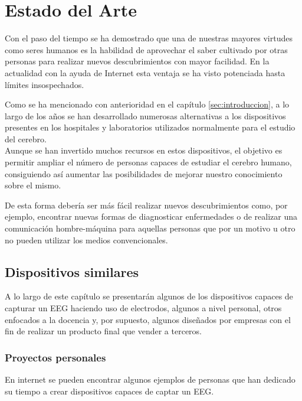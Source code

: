 \chapter{Estado del Arte\label{sec:EstadoDelArte}}

Con el paso del tiempo se ha demostrado que una de nuestras mayores virtudes como seres humanos es la habilidad de aprovechar el saber cultivado por otras personas para realizar nuevos descubrimientos con mayor facilidad. En la actualidad con la ayuda de Internet esta ventaja se ha visto potenciada hasta límites insospechados.

Como se ha mencionado con anterioridad en el capítulo \ref{sec:introduccion}, a lo largo de los años se han desarrollado numerosas alternativas a los dispositivos presentes en los hospitales y laboratorios utilizados normalmente para el estudio del cerebro. 
\\Aunque se han invertido muchos recursos en estos dispositivos, el objetivo es permitir ampliar el número de personas capaces de estudiar el cerebro humano, consiguiendo  así aumentar las posibilidades de mejorar nuestro conocimiento sobre el mismo.

De esta forma debería ser más fácil realizar nuevos descubrimientos como, por ejemplo, encontrar nuevas formas de diagnosticar enfermedades o de realizar una comunicación hombre-máquina para aquellas personas que por un motivo u otro no pueden utilizar los medios convencionales.

\clearpage

\section{Dispositivos similares\label{sec:Disp_similares}}

A lo largo de este capítulo se presentarán algunos de los dispositivos capaces de capturar un \acrshort{EEG} haciendo uso de electrodos, algunos a nivel personal, otros enfocados a la docencia y, por supuesto, algunos diseñados por empresas con el fin de realizar un producto final que vender a terceros.

\subsection{Proyectos personales\label{sec:Pro_personales}}

En internet se pueden encontrar algunos ejemplos de personas que han dedicado su tiempo a crear dispositivos capaces de captar un \acrshort{EEG}. 

